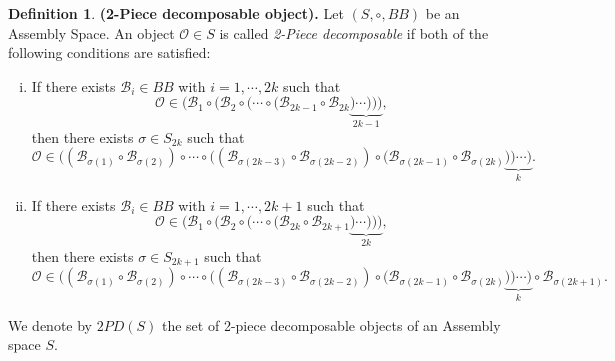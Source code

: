 \documentclass[letterpaper,12pt]{article}
\theoremstyle{definition}
\newtheorem{definition}{Definition}
\begin{document}
\begin{definition}\label{Def2PD}
    \textbf{(2-Piece decomposable object).} Let $(S,\circ,BB)$ be an Assembly Space. An object $\mathscr{O} \in S$ is called \textit{2-Piece decomposable} if both of the following conditions are satisfied:
    \begin{enumerate}[(i)]
        \item If there exists $\mathscr{B}_i \in BB$ with $i=1,\cdots,2k$ such that 
        \begin{equation}
            \mathscr{O} \in (\mathscr{B}_1 \circ (\mathscr{B}_2 \circ ( \cdots \circ (\mathscr{B}_{2k-1} \circ \mathscr{B}_{2k} \underbrace{) \cdots)  ))}_{2k-1},
        \end{equation}
        then there exists $\sigma \in S_{2k}$ such that
        \begin{equation}\label{2piece2k}
        \mathscr{O} \in ((\mathscr{B}_{\sigma(1)} \circ \mathscr{B}_{\sigma(2)}) \circ \cdots \circ ((\mathscr{B}_{\sigma(2k-3)} \circ \mathscr{B}_{\sigma(2k-2)}) \circ (\mathscr{B}_{\sigma(2k-1)} \circ \mathscr{B}_{\sigma(2k)}\underbrace{)) \cdots )}_{k}.
        \end{equation}
         \item If there exists $\mathscr{B}_i \in BB$ with $i=1,\cdots,2k+1$ such that
        \begin{equation}
 \mathscr{O} \in (\mathscr{B}_1 \circ (\mathscr{B}_2 \circ ( \cdots \circ (\mathscr{B}_{2k} \circ \mathscr{B}_{2k+1} \underbrace{) \cdots)  ))}_{2k},
        \end{equation}
        then there exists $\sigma \in S_{2k+1}$ such that
        \begin{equation}\label{2piece2k1}
            \mathscr{O} \in ((\mathscr{B}_{\sigma(1)} \circ \mathscr{B}_{\sigma(2)}) \circ \cdots \circ ((\mathscr{B}_{\sigma(2k-3)} \circ \mathscr{B}_{\sigma(2k-2)}) \circ (\mathscr{B}_{\sigma(2k-1)} \circ \mathscr{B}_{\sigma(2k)}\underbrace{)) \cdots )}_{k} \circ \mathscr{B}_{\sigma(2k+1)}.   
        \end{equation}
    \end{enumerate}   
\end{definition}
We denote by $2PD(S)$ the set of 2-piece decomposable objects of an Assembly space $S$. 
\end{document}
